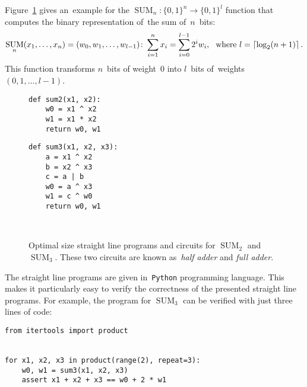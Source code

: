 \documentclass[12pt,letterpaper]{article}
\DeclareMathOperator{\SUM}{SUM}
\begin{document}
Figure~\ref{figure:sum23} gives an~example for
the 
$\SUM_n \colon \{0,1\}^n \to \{0,1\}^l$ function 
that computes the binary representation of~the sum of~$n$~bits:
\[\SUM_n(x_1, \dotsc, x_n)=(w_0, w_1, \dotsc, w_{l-1})\colon \sum_{i=1}^{n}x_i=\sum_{i=0}^{l-1}2^iw_i \text{, \, where } l=\lceil \log_2(n+1)\rceil \, .\]
This function transforms $n$~bits 
of weight~0 into $l$~bits 
of~weights $(0,1,\dotsc,l-1)$.
%
\begin{figure}[t]
\begin{minipage}{.28\textwidth}
\begin{verbatim}
def sum2(x1, x2):
    w0 = x1 ^ x2
    w1 = x1 * x2
    return w0, w1
\end{verbatim}
\end{minipage}
\begin{minipage}{.18\textwidth}
\end{minipage}
\begin{minipage}{.33\textwidth}
\begin{verbatim}
def sum3(x1, x2, x3):
    a = x1 ^ x2
    b = x2 ^ x3
    c = a | b
    w0 = a ^ x3
    w1 = c ^ w0
    return w0, w1
\end{verbatim}
\end{minipage}
\begin{minipage}{.18\textwidth}
~
\end{minipage}
\caption{Optimal size straight line programs and circuits for $\SUM_2$ and $\SUM_3$. These two circuits are known as~\emph{half adder} and \emph{full adder}.}
\label{figure:sum23}
\end{figure}
%
The straight line
programs are given 
in~\texttt{Python} programming language.
This makes it particularly easy to verify the correctness of the presented straight line programs.
For example, the program for $\SUM_3$ can be verified
with just three lines of code:
\begin{verbatim}
from itertools import product


for x1, x2, x3 in product(range(2), repeat=3):
    w0, w1 = sum3(x1, x2, x3)    
    assert x1 + x2 + x3 == w0 + 2 * w1
\end{verbatim}
\end{document}
